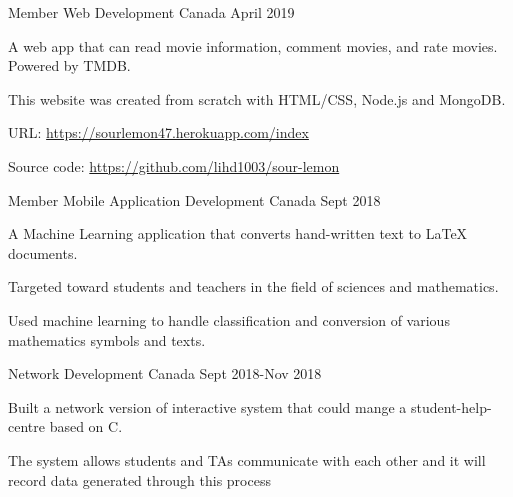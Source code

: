     


\begin{cventries}

  \cventry
    {Member} %
    {Web Development} %
    {Canada} %
    {April 2019} %
    {
      \begin{cvitems} %
        \item {A web app that can read movie information, comment movies, and rate movies. Powered by TMDB. }
        \item {This website was created from scratch with HTML/CSS, Node.js and MongoDB.}
        \item {URL: \url{https://sourlemon47.herokuapp.com/index}}
        \item {Source code: \url{https://github.com/lihd1003/sour-lemon}}
      \end{cvitems}
    }

  \cventry
    {Member} %
    {Mobile Application Development} %
    {Canada} %
    {Sept 2018} %
    {
      \begin{cvitems} %
        \item {A Machine Learning application that converts hand-written text to LaTeX documents.}
        \item {Targeted toward students and teachers in the field of sciences and mathematics. }
        \item {Used machine learning to handle classification and conversion of various mathematics symbols and texts.}
      \end{cvitems}
    }
   
  \cventry
    {Network Development} %
    {} %
    {Canada} %
    {Sept 2018-Nov 2018} %
    {
      \begin{cvitems} %
        \item {Built a network version of interactive system that could mange a student-help-centre based on C.}
        \item {The system allows students and TAs communicate with each other and it will record data generated through this process}
      \end{cvitems}
    }


\end{cventries}
